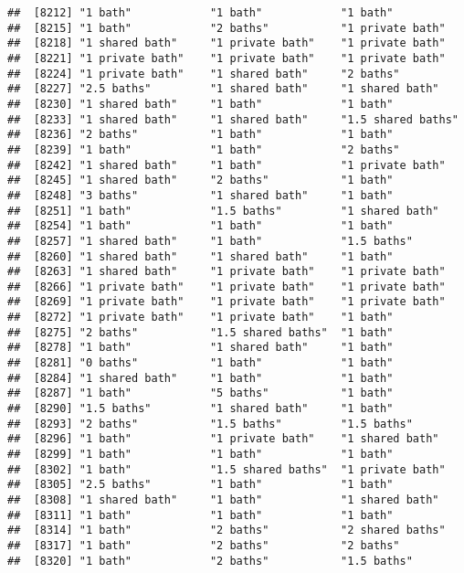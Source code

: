 \documentclass[
]{article}
\begin{document}
\begin{verbatim}
##  [8212] "1 bath"            "1 bath"            "1 bath"           
##  [8215] "1 bath"            "2 baths"           "1 private bath"   
##  [8218] "1 shared bath"     "1 private bath"    "1 private bath"   
##  [8221] "1 private bath"    "1 private bath"    "1 private bath"   
##  [8224] "1 private bath"    "1 shared bath"     "2 baths"          
##  [8227] "2.5 baths"         "1 shared bath"     "1 shared bath"    
##  [8230] "1 shared bath"     "1 bath"            "1 bath"           
##  [8233] "1 shared bath"     "1 shared bath"     "1.5 shared baths" 
##  [8236] "2 baths"           "1 bath"            "1 bath"           
##  [8239] "1 bath"            "1 bath"            "2 baths"          
##  [8242] "1 shared bath"     "1 bath"            "1 private bath"   
##  [8245] "1 shared bath"     "2 baths"           "1 bath"           
##  [8248] "3 baths"           "1 shared bath"     "1 bath"           
##  [8251] "1 bath"            "1.5 baths"         "1 shared bath"    
##  [8254] "1 bath"            "1 bath"            "1 bath"           
##  [8257] "1 shared bath"     "1 bath"            "1.5 baths"        
##  [8260] "1 shared bath"     "1 shared bath"     "1 bath"           
##  [8263] "1 shared bath"     "1 private bath"    "1 private bath"   
##  [8266] "1 private bath"    "1 private bath"    "1 private bath"   
##  [8269] "1 private bath"    "1 private bath"    "1 private bath"   
##  [8272] "1 private bath"    "1 private bath"    "1 bath"           
##  [8275] "2 baths"           "1.5 shared baths"  "1 bath"           
##  [8278] "1 bath"            "1 shared bath"     "1 bath"           
##  [8281] "0 baths"           "1 bath"            "1 bath"           
##  [8284] "1 shared bath"     "1 bath"            "1 bath"           
##  [8287] "1 bath"            "5 baths"           "1 bath"           
##  [8290] "1.5 baths"         "1 shared bath"     "1 bath"           
##  [8293] "2 baths"           "1.5 baths"         "1.5 baths"        
##  [8296] "1 bath"            "1 private bath"    "1 shared bath"    
##  [8299] "1 bath"            "1 bath"            "1 bath"           
##  [8302] "1 bath"            "1.5 shared baths"  "1 private bath"   
##  [8305] "2.5 baths"         "1 bath"            "1 bath"           
##  [8308] "1 shared bath"     "1 bath"            "1 shared bath"    
##  [8311] "1 bath"            "1 bath"            "1 bath"           
##  [8314] "1 bath"            "2 baths"           "2 shared baths"   
##  [8317] "1 bath"            "2 baths"           "2 baths"          
##  [8320] "1 bath"            "2 baths"           "1.5 baths"        

\end{verbatim}
\end{document}
